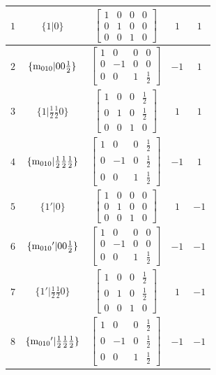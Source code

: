 \documentclass[fleqn,8pt]{jsarticle}
\begin{document}
\begin{longtable}{ccccc}
$ 1 $ & $ \{1|0\} $ & $ \begin{bmatrix} 1 & 0 & 0 & 0 \\ 0 & 1 & 0 & 0 \\ 0 & 0 & 1 & 0 \end{bmatrix} $ & $ 1 $ & $ 1 $ \\ \hline
$ 2 $ & $ \{{\rm m}_{010}|0 0 \frac{1}{2}\} $ & $ \begin{bmatrix} 1 & 0 & 0 & 0 \\ 0 & -1 & 0 & 0 \\ 0 & 0 & 1 & \frac{1}{2} \end{bmatrix} $ & $ -1 $ & $ 1 $ \\ \hline
$ 3 $ & $ \{1|\frac{1}{2} \frac{1}{2} 0\} $ & $ \begin{bmatrix} 1 & 0 & 0 & \frac{1}{2} \\ 0 & 1 & 0 & \frac{1}{2} \\ 0 & 0 & 1 & 0 \end{bmatrix} $ & $ 1 $ & $ 1 $ \\ \hline
$ 4 $ & $ \{{\rm m}_{010}|\frac{1}{2} \frac{1}{2} \frac{1}{2}\} $ & $ \begin{bmatrix} 1 & 0 & 0 & \frac{1}{2} \\ 0 & -1 & 0 & \frac{1}{2} \\ 0 & 0 & 1 & \frac{1}{2} \end{bmatrix} $ & $ -1 $ & $ 1 $ \\ \hline
$ 5 $ & $ \{1{}'|0\} $ & $ \begin{bmatrix} 1 & 0 & 0 & 0 \\ 0 & 1 & 0 & 0 \\ 0 & 0 & 1 & 0 \end{bmatrix} $ & $ 1 $ & $ -1 $ \\ \hline
$ 6 $ & $ \{{\rm m}_{010}{}'|0 0 \frac{1}{2}\} $ & $ \begin{bmatrix} 1 & 0 & 0 & 0 \\ 0 & -1 & 0 & 0 \\ 0 & 0 & 1 & \frac{1}{2} \end{bmatrix} $ & $ -1 $ & $ -1 $ \\ \hline
$ 7 $ & $ \{1{}'|\frac{1}{2} \frac{1}{2} 0\} $ & $ \begin{bmatrix} 1 & 0 & 0 & \frac{1}{2} \\ 0 & 1 & 0 & \frac{1}{2} \\ 0 & 0 & 1 & 0 \end{bmatrix} $ & $ 1 $ & $ -1 $ \\ \hline
$ 8 $ & $ \{{\rm m}_{010}{}'|\frac{1}{2} \frac{1}{2} \frac{1}{2}\} $ & $ \begin{bmatrix} 1 & 0 & 0 & \frac{1}{2} \\ 0 & -1 & 0 & \frac{1}{2} \\ 0 & 0 & 1 & \frac{1}{2} \end{bmatrix} $ & $ -1 $ & $ -1 $ \\
\end{longtable}
\end{document}
